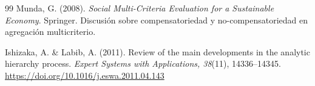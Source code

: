 \documentclass[12pt, a4paper, twoside, openright]{report}
\theoremstyle{plain}
\theoremstyle{definition}
\begin{document}
\begin{thebibliography}{99}
Munda, G. (2008).
\textit{Social Multi-Criteria Evaluation for a Sustainable Economy}.
Springer.
Discusión sobre compensatoriedad y no-compensatoriedad en agregación multicriterio.

Ishizaka, A. \& Labib, A. (2011).
Review of the main developments in the analytic hierarchy process.
\textit{Expert Systems with Applications, 38}(11), 14336--14345.
\href{https://doi.org/10.1016/j.eswa.2011.04.143}{https://doi.org/10.1016/j.eswa.2011.04.143}

\end{thebibliography}
\end{document}
